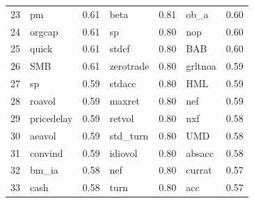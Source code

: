 \begin{footnotesize}
\begin{longtable}{rlc|lc|lc}
		23                        & pm                          & 0.61                          & beta                        & 0.81                          & ob\_a                             & 0.60           \\
		24                        & orgcap                      & 0.61                          & sp                          & 0.80                          & nop                               & 0.60           \\
		25                        & quick                       & 0.61                          & stdcf                       & 0.80                          & BAB                               & 0.60           \\
		26                        & SMB                         & 0.61                          & zerotrade                   & 0.80                          & grltnoa                           & 0.59           \\
		27                        & sp                          & 0.59                          & stdacc                      & 0.80                          & HML                               & 0.59           \\
		28                        & roavol                      & 0.59                          & maxret                      & 0.80                          & nef                               & 0.59           \\
		29                        & pricedelay                  & 0.59                          & retvol                      & 0.80                          & nxf                               & 0.58           \\
		30                        & aeavol                      & 0.59                          & std\_turn                   & 0.80                          & UMD                               & 0.58           \\
		31                        & convind                     & 0.59                          & idiovol                     & 0.80                          & absacc                            & 0.58           \\
		32                        & bm\_ia                      & 0.58                          & nef                         & 0.80                          & currat                            & 0.57           \\
		33                        & cash                        & 0.58                          & turn                        & 0.80                          & acc                               & 0.57           \\

\end{longtable}
\end{footnotesize}
